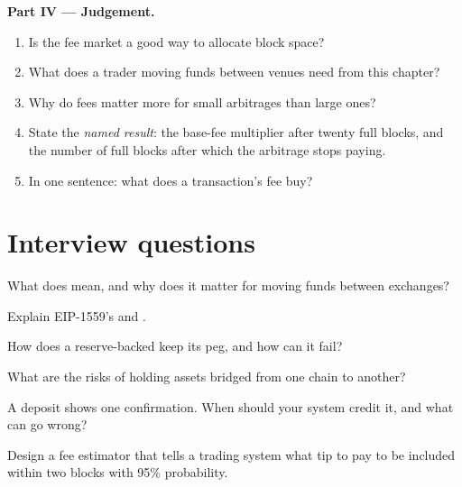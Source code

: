 \begin{problem}
\medskip\noindent\textbf{Part IV --- Judgement.}
\begin{enumerate}[resume]
\item Is the fee market a good way to allocate block space?
\item What does a trader moving funds between venues need from this chapter?
\item Why do fees matter more for small arbitrages than large ones?
\item State the \emph{named result}: the base-fee multiplier after twenty full blocks, and the number of full blocks
after which the arbitrage stops paying.
\item In one sentence: what does a transaction's fee buy?
\end{enumerate}
\end{problem}

\section{Interview questions}

\begin{interviewq}\label{iq:m3:blockchains-for-traders:1}
What does  mean, and why does it matter for moving funds between exchanges?
\end{interviewq}

\begin{interviewq}\label{iq:m3:blockchains-for-traders:2}
Explain EIP-1559's  and .
\end{interviewq}

\begin{interviewq}\label{iq:m3:blockchains-for-traders:3}
How does a reserve-backed  keep its peg, and how can it fail?
\end{interviewq}

\begin{interviewq}\label{iq:m3:blockchains-for-traders:4}
What are the risks of holding assets bridged from one chain to another?
\end{interviewq}

\begin{interviewq}\label{iq:m3:blockchains-for-traders:5}
A deposit shows one confirmation. When should your system credit it, and what can go wrong?
\end{interviewq}

\begin{interviewq}\label{iq:m3:blockchains-for-traders:6}
Design a fee estimator that tells a trading system what tip to pay to be included within two blocks with 95\%
probability.
\end{interviewq}
